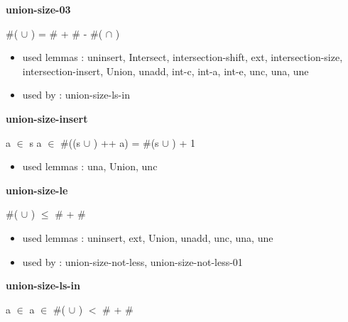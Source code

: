 \documentclass[a4paper]{article}
\begin{document}
\medskip

\bigskip

{\large\bf union-size-03}

\medskip

 \Fol \#( $\cup$ ) = \#  + \#  - \#( $\cap$ )

\begin{itemize}


\item       used lemmas  : uninsert, Intersect, intersection-shift, ext, intersection-size, intersection-insert, Union, unadd, int-c, int-a, int-e, unc, una, une
\item       used by      : union-size-ls-in

\end{itemize}

\medskip

\bigskip

{\large\bf union-size-insert}

\medskip

 \Fol \Not a $\in$ s \And \Not a $\in$  \Imp \#((s $\cup$ ) ++ a) = \#(s $\cup$ ) + 1

\begin{itemize}


\item       used lemmas  : una, Union, unc

\end{itemize}

\medskip

\bigskip

{\large\bf union-size-le}

\medskip

 \Fol \#( $\cup$ ) $\le$ \#  + \# 

\begin{itemize}


\item       used lemmas  : uninsert, ext, Union, unadd, unc, una, une
\item       used by      : union-size-not-less, union-size-not-less-01

\end{itemize}

\medskip

\bigskip

{\large\bf union-size-ls-in}

\medskip

 \Fol a $\in$  \And a $\in$  \Imp \#( $\cup$ ) $<$ \#  + \# 
\end{document}
